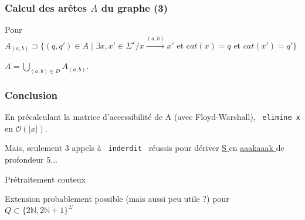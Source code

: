 \documentclass[12pt]{beamer}
\begin{document}
\begin{frame}\frametitle{Calcul des arêtes $A$ du graphe (3)}
Pour
$A_{(a,b)} \supset \{(q,q') \in A \mid \exists x,x' \in \Sigma^\star / x \overset{(a,b)}{\rightarrow} x' \text{ et } cat(x) = q \text{ et } cat(x') = q'\}$

$A = \bigcup_{(a,b) \in D}  A_{(a,b)}$.

\end{frame}

\begin{frame}\frametitle{Conclusion}
En précalculant la matrice d'accessibilité de A (avec Floyd-Warshall), \texttt{ elimine x } en $\mathcal{O} (|x|)$.
\pause

Mais, seulement 3 appels à \texttt{ inderdit } réussis pour dériver \underline{ S } en \underline{ aaakaaak } de profondeur 5...
\pause

Prétraitement couteux
\pause

Extension probablement possible (mais aussi peu utile ?) pour $Q \subset \{2 \mathbb{N} , 2 \mathbb{N} + 1 \}^\Sigma$

\end{frame}
\end{document}
